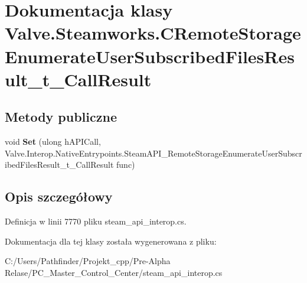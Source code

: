 \hypertarget{class_valve_1_1_steamworks_1_1_c_remote_storage_enumerate_user_subscribed_files_result__t___call_result}{}\section{Dokumentacja klasy Valve.\+Steamworks.\+C\+Remote\+Storage\+Enumerate\+User\+Subscribed\+Files\+Result\+\_\+t\+\_\+\+Call\+Result}
\label{class_valve_1_1_steamworks_1_1_c_remote_storage_enumerate_user_subscribed_files_result__t___call_result}
\subsection*{Metody publiczne}
\begin{DoxyCompactItemize}
\item 
\mbox{\label{class_valve_1_1_steamworks_1_1_c_remote_storage_enumerate_user_subscribed_files_result__t___call_result_ac07880528e924386ac8e97d2337d891a}} 
void {\bfseries Set} (ulong h\+A\+P\+I\+Call, Valve.\+Interop.\+Native\+Entrypoints.\+Steam\+A\+P\+I\+\_\+\+Remote\+Storage\+Enumerate\+User\+Subscribed\+Files\+Result\+\_\+t\+\_\+\+Call\+Result func)
\end{DoxyCompactItemize}


\subsection{Opis szczegółowy}


Definicja w linii 7770 pliku steam\+\_\+api\+\_\+interop.\+cs.



Dokumentacja dla tej klasy została wygenerowana z pliku\+:\begin{DoxyCompactItemize}
\item 
C\+:/\+Users/\+Pathfinder/\+Projekt\+\_\+cpp/\+Pre-\/\+Alpha Relase/\+P\+C\+\_\+\+Master\+\_\+\+Control\+\_\+\+Center/steam\+\_\+api\+\_\+interop.\+cs\end{DoxyCompactItemize}
